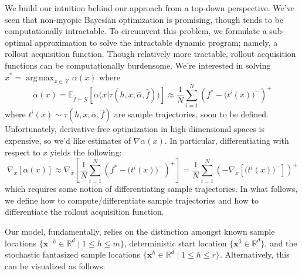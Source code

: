\documentclass{article}
\DeclareMathOperator*{\argmax}{arg\,max}
\begin{document}
\label{models_and_methods}
We build our intuition behind our approach from a top-down perspective. We've seen that non-myopic 
Bayesian optimization is promising, though tends to be computationally intractable. To circumvent
this problem, we formulate a sub-optimal approximation to solve the intractable dynamic program;
namely, a rollout acquisition function. Though relatively more tractable, rollout acquisition
functions can be computationally burdensome. We're interested in solving $x^{*} = \argmax_{x \in 
\mathcal{X}} \alpha(x)$ where
\begin{equation}
        \alpha(x) = \mathbb{E}_{\hat{f}\sim\mathcal{G}}
        \left[\alpha\big(x|\tau(h,x,\bar{\alpha},\hat{f})\big)\right]
        \approx \frac{1}{N}\sum_{i=1}^N (f^*-\bigl(t^i(x)\bigr)^-)^+
\end{equation}
where $t^i(x) \sim \tau(h,x,\bar{\alpha},\hat{f})$ are sample trajectories, soon to be defined.
Unfortunately, derivative-free optimization in high-dimensional spaces is expensive, so
we'd like estimates of $\nabla\alpha(x)$. In particular, differentiating with respect to $x$
yields the following:
\begin{equation}
    \nabla_x\left[\alpha(x)\right] \approx \nabla_x
    \left[\frac{1}{N}\sum_{i=1}^N (f^*-\bigl(t^i(x)\bigr)^-)^+\right]
    = \frac{1}{N}\sum_{i=1}^N \left(-\nabla_x\left[\bigl(t^i(x)\bigr)^-\right]\right)^+
\end{equation}
which requires some notion of differentiating sample trajectories. In what follows, we define
how to compute/differentiate sample trajectories and how to differentiate the rollout
acquisition function.


Our model, fundamentally, relies 
on the distinction amongst known sample locations $\{\textbf{x}^{-h} \in\mathbb{R}^d \;|\; 1 \leq h \leq 
m\}$, deterministic start location $\{\textbf{x}^0 \in\mathbb{R}^d\}$, and the stochastic fantasized 
sample locations $\{\textbf{x}^h \in\mathbb{R}^d\;|\; 1 \leq h \leq r\}$. Alternatively, this can be 
visualized as follows:
\end{document}
